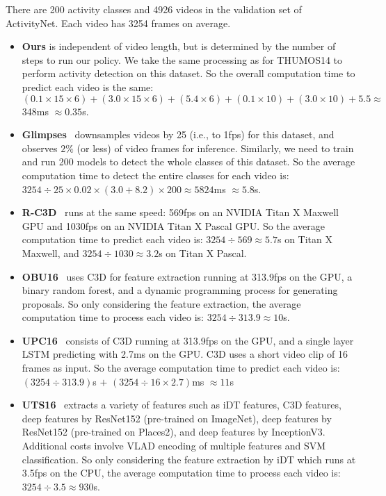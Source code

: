\documentclass{bmvc2k}
\begin{document}
There are 200 activity classes and 4926 videos in the validation set of ActivityNet. Each video has 3254 frames on average. 

\begin{itemize}
\item \textbf{Ours} is independent of video length, but is determined by the number of steps to run our policy. We take the same processing as for THUMOS14 to perform activity detection on this dataset. So the overall computation time to predict each video is the same: $(0.1\times15\times6) + (3.0\times15\times6) + (5.4\times6) + (0.1\times10) + (3.0\times10) + 5.5 \approx$ 348ms $\approx 0.35$s. 

\item \textbf{Glimpses}~\cite{yeung2015end} downsamples videos by 25 (i.e., to 1fps) for this dataset, and observes $2\%$ (or less) of video frames for inference. Similarly, we need to train and run 200 models to detect the whole classes of this dataset. So the average computation time to detect the entire classes for each video is: $3254 \div 25 \times 0.02 \times (3.0 + 8.2) \times 200 \approx 5824$ms $\approx 5.8$s.

\item \textbf{R-C3D}~\cite{r-c3d} runs at the same speed: 569fps on an NVIDIA Titan X Maxwell GPU and 1030fps on an NVIDIA Titan X Pascal GPU. So the average computation time to predict each video is: $3254 \div 569 \approx 5.7$s on Titan X Maxwell, and $3254 \div 1030 \approx 3.2$s on Titan X Pascal.

\item \textbf{OBU16}~\cite{singh2016untrimmed} uses C3D for feature extraction running at 313.9fps on the GPU, a binary random forest, and a dynamic programming process for generating proposals. So only considering the feature extraction, the average computation time to process each video is: $3254 \div 313.9 \approx 10$s. 

\item \textbf{UPC16}~\cite{upc} consists of C3D running at 313.9fps on the GPU, and a single layer LSTM predicting with 2.7ms on the GPU. C3D uses a short video clip of 16 frames as input. So the average computation time to predict each video is: $(3254 \div 313.9)$s $+$ $(3254 \div 16 \times 2.7)$ms $\approx 11$s 

\item \textbf{UTS16}~\cite{uts} extracts a variety of features such as iDT features, C3D features, deep features by ResNet152 (pre-trained on ImageNet), deep features by ResNet152 (pre-trained on Places2), and deep features by InceptionV3. Additional costs involve VLAD encoding of multiple features and SVM classification. So only considering the feature extraction by iDT which runs at 3.5fps on the CPU, the average computation time to process each video is: $3254 \div 3.5 \approx 930$s. 


\end{itemize}
\end{document}
